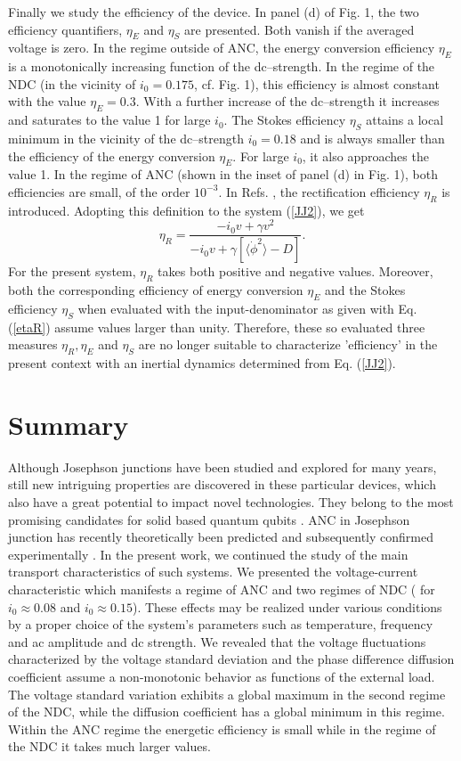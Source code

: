 \documentclass{physeauth}
\def\be{\begin{equation}}
\def\ee#1{\label{#1}\end{equation}}
\def\la{\langle}
\def\ra{\rangle}
\begin{document}
Finally we study the efficiency of the device. In panel (d) of
Fig. 1, the two efficiency quantifiers, $\eta_E$ and  $\eta_S$ are presented. 
Both vanish if the averaged voltage is zero. 
In the regime outside of ANC, the energy conversion  efficiency
$\eta_E$ is a monotonically increasing  function of the dc--strength.  
In the  regime of the  NDC (in the vicinity of  $i_0=0.175$,
cf. Fig. 1), this efficiency is almost constant with the value
$\eta_{E} = 0.3$.   With a further increase of the dc--strength it increases and saturates 
to the value 1 for large $i_0$.  The Stokes efficiency  $\eta_S$  attains a local minimum in the
vicinity of the dc--strength  $i_0=0.18$ and is 
 always  smaller  than the efficiency of the energy conversion $\eta_E$.  
For large $i_0$, it also approaches the value 1. 
In the regime of ANC (shown in the inset of panel (d) in Fig. 1),  both efficiencies  
are small, of the order $10^{-3}$.  In Refs.
\cite{Suzuki2003},  the rectification efficiency
$\eta_R$ is introduced. Adopting this definition to the system (\ref{JJ2}), we get 
\be
 \eta_R = \frac{-i_0 v + \gamma v^2}{-i_0 v +  \gamma [\la \dot\phi^2 \ra - D]}. 
\ee{etaR}
%
For the present system,   $\eta_R$  takes both positive and
 negative values. Moreover,   both the corresponding   efficiency of energy conversion $\eta_E$ and   
the Stokes efficiency  $\eta_S$  when evaluated with  the input-denominator as 
given with Eq.  (\ref{etaR}) assume  values larger than unity.  Therefore, these so evaluated three measures  $\eta_R, \eta_E$ and $\eta_S$  are no longer suitable to characterize 'efficiency' 
in the present context with an inertial dynamics determined  from  Eq. (\ref{JJ2}). 

\section{Summary}

Although Josephson junctions have been studied and explored for many
years, still  new   intriguing properties are discovered  in these particular
devices, which also 
have  a great potential to impact novel technologies. They
belong to the most promising candidates for    solid based quantum qubits \cite{qubits}.   
ANC in Josephson junction has recently theoretically been predicted
\cite{machuraPRL} and subsequently
confirmed experimentally \cite{raj}. 
In the present work, we continued the study of  the main
transport characteristics of such  systems. We presented the
voltage-current characteristic which manifests  a regime of ANC and 
two regimes of NDC ( for $i_0 \approx 0.08$ and $i_0 \approx  0.15$). 
These effects may be realized  under various conditions  by a proper 
choice of the system's parameters such as temperature, frequency and ac
amplitude and    dc strength. 
We revealed that the voltage fluctuations characterized by the voltage
standard deviation and the phase difference diffusion coefficient 
 assume a non-monotonic behavior as functions of the
external load. The voltage standard variation exhibits a global maximum in
the second regime of  the NDC, while the diffusion coefficient has a
global minimum in this regime.  Within the ANC regime the 
energetic efficiency is   small while in the regime of the NDC it
takes much larger values.   
\end{document}
